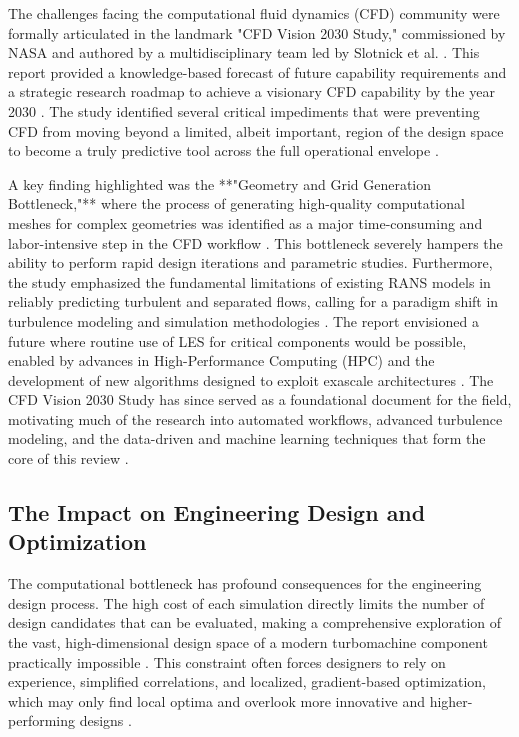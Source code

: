 \documentclass[dsc, EN]{ufabcFHZh}
\begin{document}
The challenges facing the computational fluid dynamics (CFD) community were formally articulated in the landmark "CFD Vision 2030 Study," commissioned by NASA and authored by a multidisciplinary team led by Slotnick et al. \citep{slotnick2014cfd, park2016unstructured}. This report provided a knowledge-based forecast of future capability requirements and a strategic research roadmap to achieve a visionary CFD capability by the year 2030 \citep{slotnick2014cfd, turbo_146_3_031009}. The study identified several critical impediments that were preventing CFD from moving beyond a limited, albeit important, region of the design space to become a truly predictive tool across the full operational envelope \citep{park2016unstructured}.

A key finding highlighted was the **"Geometry and Grid Generation Bottleneck,"** where the process of generating high-quality computational meshes for complex geometries was identified as a major time-consuming and labor-intensive step in the CFD workflow \citep{synthesized2024}. This bottleneck severely hampers the ability to perform rapid design iterations and parametric studies. Furthermore, the study emphasized the fundamental limitations of existing RANS models in reliably predicting turbulent and separated flows, calling for a paradigm shift in turbulence modeling and simulation methodologies \citep{park2016unstructured, zhang2021review}. The report envisioned a future where routine use of LES for critical components would be possible, enabled by advances in High-Performance Computing (HPC) and the development of new algorithms designed to exploit exascale architectures \citep{slotnick2014cfd, park2016unstructured}. The CFD Vision 2030 Study has since served as a foundational document for the field, motivating much of the research into automated workflows, advanced turbulence modeling, and the data-driven and machine learning techniques that form the core of this review \citep{synthesized2024}.

\subsection{The Impact on Engineering Design and Optimization}

The computational bottleneck has profound consequences for the engineering design process. The high cost of each simulation directly limits the number of design candidates that can be evaluated, making a comprehensive exploration of the vast, high-dimensional design space of a modern turbomachine component practically impossible \citep{synthesized2024}. This constraint often forces designers to rely on experience, simplified correlations, and localized, gradient-based optimization, which may only find local optima and overlook more innovative and higher-performing designs \citep{synthesized2024}.
\end{document}
